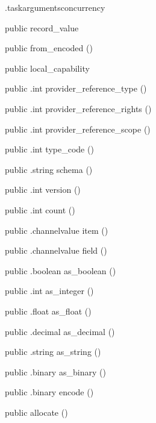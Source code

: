 \begin{CrexxClass}{.taskarguments}{concurrency}
\begin{Members}
    \Factory
      {public}
      {record\_value}
      {}

    \Factory
      {public}
      {from\_encoded}
      {()}

    \Factory
      {public}
      {local\_capability}
      {}

    \Method
      {public}
      {.int}
      {provider\_reference\_type}
      {()}

    \Method
      {public}
      {.int}
      {provider\_reference\_rights}
      {()}

    \Method
      {public}
      {.int}
      {provider\_reference\_scope}
      {()}

    \Method
      {public}
      {.int}
      {type\_code}
      {()}

    \Method
      {public}
      {.string}
      {schema}
      {()}

    \Method
      {public}
      {.int}
      {version}
      {()}

    \Method
      {public}
      {.int}
      {count}
      {()}

    \Method
      {public}
      {.channelvalue}
      {item}
      {()}

    \Method
      {public}
      {.channelvalue}
      {field}
      {()}

    \Method
      {public}
      {.boolean}
      {as\_boolean}
      {()}

    \Method
      {public}
      {.int}
      {as\_integer}
      {()}

    \Method
      {public}
      {.float}
      {as\_float}
      {()}

    \Method
      {public}
      {.decimal}
      {as\_decimal}
      {()}

    \Method
      {public}
      {.string}
      {as\_string}
      {()}

    \Method
      {public}
      {.binary}
      {as\_binary}
      {()}

    \Method
      {public}
      {.binary}
      {encode}
      {()}

    \Factory
      {public}
      {allocate}
      {()}


\end{Members}
\end{CrexxClass}
